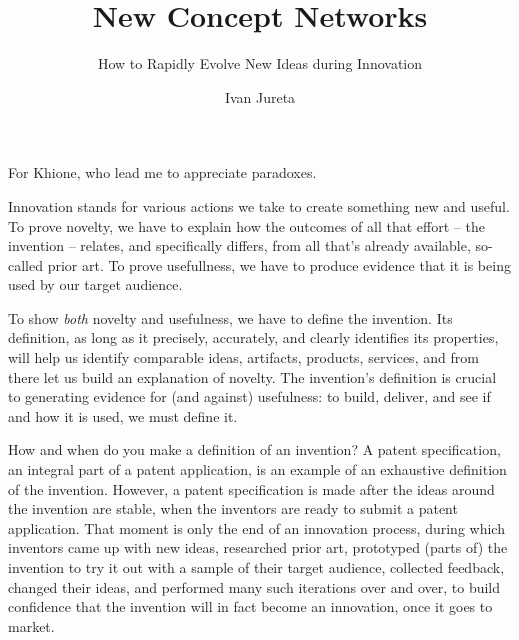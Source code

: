 \documentclass[graybox,envcountchap,sectrefs]{svmono}
\newcommand{\ncnf}{New Concept Network}
\begin{document}
\author{Ivan Jureta}
\title{\ncnf s}
\subtitle{How to Rapidly Evolve New Ideas during Innovation}
\maketitle

\frontmatter

%
\begin{dedication}
For Khione, who lead me to appreciate paradoxes.
\end{dedication}

%

%
\preface
Innovation stands for various actions we take to create something new and useful. To prove novelty, we have to explain how the outcomes of all that effort -- the invention -- relates, and specifically differs, from all that's already available, so-called prior art. To prove usefullness, we have to produce evidence that it is being used by our target audience. 

To show \textit{both} novelty and usefulness, we have to define the invention. Its definition, as long as it precisely, accurately, and clearly identifies its properties, will help us identify comparable ideas, artifacts, products, services, and from there let us build an explanation of novelty. The invention's definition is crucial to generating evidence for (and against) usefulness: to build, deliver, and see if and how it is used, we must define it. 

How and when do you make a definition of an invention? A patent specification, an integral part of a patent application, is an example of an exhaustive definition of the invention. However, a patent specification is made after the ideas around the invention are stable, when the inventors are ready to submit a patent application. That moment is only the end of an innovation process, during which inventors came up with new ideas, researched prior art, prototyped (parts of) the invention to try it out with a sample of their target audience, collected feedback, changed their ideas, and performed many such iterations over and over, to build confidence that the invention will in fact become an innovation, once it goes to market. 
\end{document}
